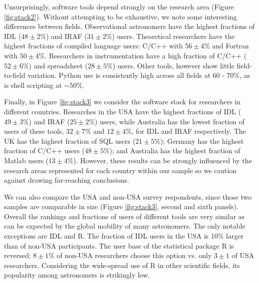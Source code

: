 Unsurprisingly, software tools depend strongly on the research area (Figure \ref{fig:stack2}). Without attempting to be exhaustive, we note some interesting differences between fields. Observational astronomers have the highest fractions of IDL ($48\pm2\%$) and IRAF ($31\pm2\%$) users. Theoretical researchers have the highest fractions of compiled language users: C/C++ with $56\pm4\%$ and Fortran with $50\pm4\%$. Researchers in instrumentation have a high fraction of C/C++ ($52\pm6\%$) and spreadsheet ($28\pm5\%$) users. Other tools, however show little field-to-field variation. Python use is consistently high across all fields at 60 - 70\%, as is shell scripting at $\sim50\%$. 

Finally, in Figure \ref{fig:stack3} we consider the software stack for researchers in different countries. Researches in the USA have the highest fractions of IDL ($49\pm3\%$) and IRAF ($25\pm2\%$) users, while Australia has the lowest fraction of users of these tools, $32\pm7\%$ and $12\pm4\%$, for IDL and IRAF respectively. The UK has the highest fraction of SQL users ($21\pm5\%$); Germany has the highest fraction of C/C++ users ($48\pm5\%$); and Australia has the highest fraction of Matlab users ($13\pm4\%$). However, these results can be strongly influenced by the research areas represented for each country within our sample so we caution against drawing far-reaching conclusions. 

We can also compare the USA and non-USA survey respondents, since those two samples are comparable in size (Figure \ref{fig:stack3}, second and sixth panels). Overall the rankings and fractions of users of different tools are very similar as can be expected by the global mobility of many astronomers. The only notable exceptions are IDL and R. The fraction of IDL users in the USA is 10\% larger than of non-USA participants. The user base of the statistical package R is reversed:  $8\pm1\%$ of non-USA researchers choose this option vs. only $3\pm1$ of USA researchers. Considering the wide-spread use of R in other scientific fields, its popularity among astronomers is strikingly low.
    
  
  
  